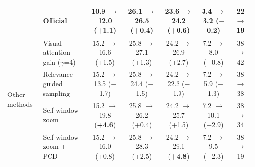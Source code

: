 \begin{table}[t]
\begin{tabular}{llccccc}
 & Official & 10.9 $\rightarrow$ 12.0 (+1.1) & 26.1 $\rightarrow$ 26.5 (+0.4) & 23.6 $\rightarrow$ 24.2 (+0.6) & 3.4 $\rightarrow$ 3.2 ($-$0.2) & 22 $\rightarrow$ 19 \\
\midrule
\multirow{4}{*}{Other methods} & Visual-attention gain ($\gamma$=4) & 15.2 $\rightarrow$ 16.6 (+1.5) & 25.8 $\rightarrow$ 27.1 (+1.3) & 24.2 $\rightarrow$ 26.9 (+2.7) & 7.2 $\rightarrow$ 8.0 (+0.8) & 38 $\rightarrow$ 42 \\
 & Relevance-guided sampling & 15.2 $\rightarrow$ 13.5 ($-$1.7) & 25.8 $\rightarrow$ 24.4 ($-$1.5) & 24.2 $\rightarrow$ 22.3 ($-$1.9) & 7.2 $\rightarrow$ 5.9 ($-$1.3) & 38 $\rightarrow$ 38 \\
 & Self-window zoom & 15.2 $\rightarrow$ 19.8 (\textbf{+4.6}) & 25.8 $\rightarrow$ 26.2 (+0.4) & 24.2 $\rightarrow$ 25.7 (+1.5) & 7.2 $\rightarrow$ 10.1 (+2.9) & 38 $\rightarrow$ 34 \\
 & Self-window zoom + PCD & 15.2 $\rightarrow$ 16.0 (+0.8) & 25.8 $\rightarrow$ 28.3 (+2.5) & 24.2 $\rightarrow$ 29.1 (\textbf{+4.8}) & 7.2 $\rightarrow$ 9.5 (+2.3) & 38 $\rightarrow$ 19 \\
\bottomrule
\end{tabular}
\end{table}
